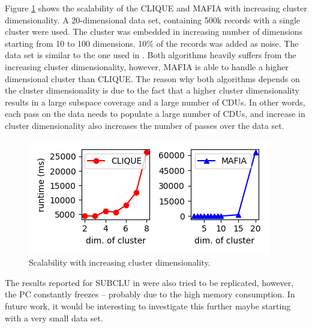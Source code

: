 Figure \ref{fig:cluster_dimensionality_vs_runtime} shows the scalability of the CLIQUE and MAFIA with increasing cluster dimensionality. A 20-dimensional data set, containing 500k records with a single cluster were used. The cluster was embedded in increasing number of dimensions starting from 10 to 100 dimensions. 10\% of the records was added as noise. The data set is similar to the one used in \cite{mafia}. Both algorithms heavily suffers from the increasing cluster dimensionality, however, MAFIA is able to handle a higher dimensional cluster than CLIQUE. The reason why both algorithms depends on the cluster dimensionality is due to the fact that a higher cluster dimensionality results in a large subspace coverage and a large number of CDUs. In other words, each pass on the data needs to populate a large number of CDUs, and increase in cluster dimensionality also increases the number of passes over the data set.
\begin{figure}[H]
    \vspace*{-0.7cm}
    \centering
    \includegraphics[scale=0.45]{figures/cluster_dimensionality_vs_runtime.png}
    \caption{Scalability with increasing cluster dimensionality.}
    \label{fig:cluster_dimensionality_vs_runtime}
    \vspace*{-0.7cm}
\end{figure}

The results reported for SUBCLU in \cite{subclu} were also tried to be replicated, however, the PC constantly freezes -- probably due to the high memory consumption. In future work, it would be interesting to investigate this further maybe starting with a very small data set.

